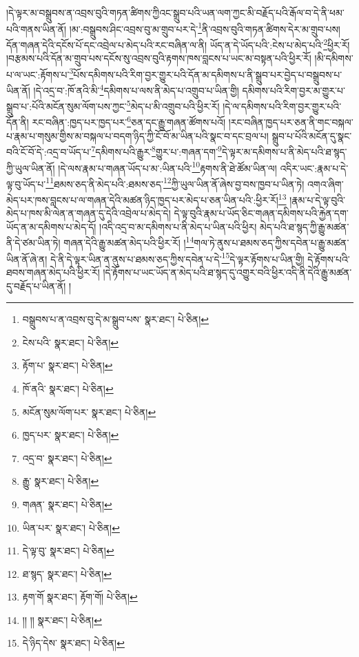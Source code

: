 །དེ་ལྟར་མ་བསྒྲུབས་ན་འབྲས་བུའི་གཏན་ཚིགས་ཀྱིའང་སྒྲུབ་པའི་ཡན་ལག་ཀྱང་མི་བརྗོད་པའི་རྒོལ་བ་དེ་ནི་ཕམ་པའི་གནས་ཡིན་ནོ། །མ་:བསྒྲུབས་ཤིང་འབྲས་བུ་མ་གྲུབ་པར་དེ་\footnote{བསྒྲུབས་པ་ན་འབྲས་བུ་དེ་མ་སྒྲུབ་པས་  སྣར་ཐང་།  པེ་ཅིན། }ནི་འབྲས་བུའི་གཏན་ཚིགས་དེར་མ་གྲུབ་པས། དོན་གཞན་དེའི་དངོས་པོ་དང་འབྲེལ་པ་མེད་པའི་རང་བཞིན་ལ་ནི། ཡོད་ན་དེ་ཡོད་པའི་:ངེས་པ་མེད་པའི་\footnote{ངེས་པའི་  སྣར་ཐང་།  པེ་ཅིན། }ཕྱིར་རོ། །བརྩམས་པའི་དོན་མ་གྲུབ་པས་དངོས་སུ་འབྲས་བུའི་རྟགས་ཁས་བླངས་པ་ཡང་མ་བསྟན་པའི་ཕྱིར་རོ། །མི་དམིགས་པ་ལ་ཡང་:རྟོགས་པ་\footnote{རྟོག་པ་  སྣར་ཐང་།  པེ་ཅིན། }པོས་དམིགས་པའི་རིག་བྱར་གྱུར་པའི་དོན་མ་དམིགས་པ་ནི་སྒྲུབ་པར་བྱེད་པ་བསྒྲུབས་པ་ཡིན་ནོ། །དེ་འདྲ་བ་:ཁོ་ནའི་མི་\footnote{ཁོ་ནའི་  སྣར་ཐང་།  པེ་ཅིན། }དམིགས་པ་ལས་ནི་མེད་པ་འགྲུབ་པ་ཡིན་གྱི། དམིགས་པའི་རིག་བྱར་མ་གྱུར་པ་སྒྲུབ་པ་:པོའི་མངོན་སུམ་ལོག་པས་ཀྱང་\footnote{མངོན་སུམ་ལོག་པར་  སྣར་ཐང་།  པེ་ཅིན། }མེད་པ་མི་འགྲུབ་པའི་ཕྱིར་རོ། །དེ་ལ་དམིགས་པའི་རིག་བྱར་གྱུར་པའི་དོན་ནི། རང་བཞིན་:ཁྱད་པར་ཁྱད་པར་\footnote{ཁྱད་པར་  སྣར་ཐང་།  པེ་ཅིན། }ཅན་དང་རྒྱུ་གཞན་ཚོགས་པའོ། །རང་བཞིན་ཁྱད་པར་ཅན་ནི་གང་བསྐལ་པ་རྣམ་པ་གསུམ་གྱིས་མ་བསྐལ་པ་བདག་ཉིད་ཀྱི་ངོ་བོ་མ་ཡིན་པའི་སྣང་བ་དང་བྲལ་པ། སྒྲུབ་པ་པོའི་མངོན་དུ་སྣང་བའི་ངོ་བོ་དེ་:འདྲ་བ་ཡོད་པ་\footnote{འདྲ་བ་  སྣར་ཐང་།  པེ་ཅིན། }དམིགས་པའི་རྒྱུར་\footnote{རྒྱུ་  སྣར་ཐང་།  པེ་ཅིན། }གྱུར་པ་:གཞན་དག་\footnote{གཞན་  སྣར་ཐང་།  པེ་ཅིན། }དེ་ལྟར་མ་དམིགས་པ་ནི་མེད་པའི་ཐ་སྙད་ཀྱི་ཡུལ་ཡིན་ནོ། །དེ་ལས་རྣམ་པ་གཞན་ཡོད་པ་མ་:ཡིན་པའི་\footnote{ཡིན་པར་  སྣར་ཐང་།  པེ་ཅིན། }རྟགས་ནི་ཐེ་ཚོམ་ཡིན་ལ། འདིར་ཡང་:རྣམ་པ་དེ་ལྟ་བུ་ཡོད་པ་\footnote{དེ་ལྟ་བུ་  སྣར་ཐང་།  པེ་ཅིན། }ཐམས་ཅད་ནི་མེད་པའི་:ཐམས་ཅད་\footnote{ཐ་སྙད་  སྣར་ཐང་།  པེ་ཅིན། }ཀྱི་ཡུལ་ཡིན་ནོ་ཞེས་བྱ་བས་ཁྱབ་པ་ཡིན་ཏེ། འགའ་ཞིག་མེད་པར་ཁས་བླངས་པ་ལ་གཞན་དེའི་མཚན་ཉིད་ཁྱད་པར་མེད་པ་ཅན་ཡིན་པའི་:ཕྱིར་རོ།\footnote{རྟག་གོ  སྣར་ཐང་། རྟོག་གོ།  པེ་ཅིན། } །རྣམ་པ་དེ་ལྟ་བུའི་མེད་པ་ཁས་མི་ལེན་ན་གཞན་དུ་དེའི་འབྲེལ་པ་མེད་དེ། དེ་ལྟ་བུའི་རྣམ་པ་ཡོད་ཅིང་གཞན་དམིགས་པའི་རྐྱེན་དག་ཡོད་ན་མ་དམིགས་པ་མེད་དོ། །འདི་འདྲ་བ་མ་དམིགས་པ་ནི་མེད་པ་ཡིན་པའི་ཕྱིར། མེད་པའི་ཐ་སྙད་ཀྱི་རྒྱུ་མཚན་ནི་དེ་ཙམ་ཡིན་ཏེ། གཞན་དེའི་རྒྱུ་མཚན་མེད་པའི་ཕྱིར་རོ། །\footnote{།། །།  སྣར་ཐང་།  པེ་ཅིན། }གལ་ཏེ་ནུས་པ་ཐམས་ཅད་ཀྱིས་དབེན་པ་རྒྱུ་མཚན་ཡིན་ནོ་ཞེ་ན། དེ་ནི་དེ་ལྟར་ཡིན་ན་ནུས་པ་ཐམས་ཅད་ཀྱིས་དབེན་པ་དེ་\footnote{དེ་ཉིད་དེས་  སྣར་ཐང་།  པེ་ཅིན། }དེ་ལྟར་རྟོགས་པ་ཡིན་གྱི། དེ་རྟོགས་པའི་ཐབས་གཞན་མེད་པའི་ཕྱིར་རོ། །དེ་རྟོགས་པ་ཡང་ཡོད་ན་མེད་པའི་ཐ་སྙད་དུ་འགྱུར་བའི་ཕྱིར་འདི་ནི་དེའི་རྒྱུ་མཚན་དུ་བརྗོད་པ་ཡིན་ནོ། །
